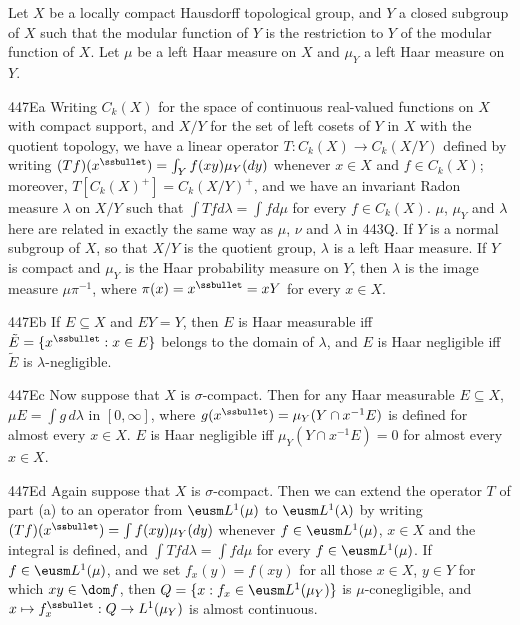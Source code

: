 Let $X$ be a locally compact Hausdorff topological group,
and $Y$ a closed subgroup of $X$ such that the modular function of $Y$
is the restriction to $Y$ of the modular function of $X$.   Let $\mu$ be
a left Haar measure on $X$ and $\mu_Y$ a left Haar measure on $Y$.

\spheader 447Ea Writing $C_k(X)$ for the space of continuous real-valued
functions on $X$ with compact support, and $X/Y$ for the set of left
cosets of $Y$ in $X$ with the quotient topology, we have a linear
operator $T:C_k(X)\to C_k(X/Y)$ defined by writing
$(Tf)(x^{\ssbullet})=\int_Yf(xy)\mu_Y(dy)$ whenever $x\in X$ and
$f\in C_k(X)$;  moreover,
$T[C_k(X)^+]=C_k(X/Y)^+$, and we have an invariant
Radon measure
$\lambda$ on $X/Y$ such that $\int Tfd\lambda=\int fd\mu$ for every
$f\in C_k(X)$.
 $\mu$,
$\mu_Y$ and $\lambda$ here are related
in exactly the same way as $\mu$, $\nu$ and $\lambda$ in 443Q.
If $Y$ is a normal subgroup of $X$, so that $X/Y$ is the quotient group,
$\lambda$ is a left Haar measure.   If $Y$ is compact and $\mu_Y$ is the
Haar probability measure on $Y$, then $\lambda$ is the image measure
$\mu\pi^{-1}$, where $\pi(x)=x^{\ssbullet}=xY$ for every
$x\in X$.

\spheader 447Eb If $E\subseteq X$ and $EY=Y$, then $E$ is Haar
measurable iff $\tilde E=\{x^{\ssbullet}:x\in E\}$ belongs to the domain
of $\lambda$, and $E$ is Haar negligible iff $\tilde E$ is
$\lambda$-negligible.

\spheader 447Ec Now suppose that $X$ is $\sigma$-compact.   Then for any
Haar measurable $E\subseteq X$, $\mu E=\int g\,d\lambda$ in
$[0,\infty]$, where $g(x^{\ssbullet})=\mu_Y(Y\cap x^{-1}E)$ is defined for
almost every $x\in X$.   $E$
is Haar negligible
iff $\mu_Y(Y\cap x^{-1}E)=0$ for almost every $x\in X$.

\spheader 447Ed Again suppose that $X$ is $\sigma$-compact.   Then we
can extend the operator $T$ of part (a) to an operator from
$\eusm L^1(\mu)$ to $\eusm L^1(\lambda)$ by writing
$(Tf)(x^{\ssbullet})=\int f(xy)\mu_Y(dy)$ whenever $f\in\eusm L^1(\mu)$,
$x\in X$ and the integral is defined, and $\int Tfd\lambda=\int fd\mu$ for every
$f\in\eusm L^1(\mu)$.   If $f\in\eusm L^1(\mu)$, and
we set $f_x(y)=f(xy)$
for all those $x\in X$, $y\in Y$ for which $xy\in\dom f$, then
$Q=\{x:f_x\in\eusm L^1(\mu_Y)\}$ is $\mu$-conegligible, and
$x\mapsto f_x^{\ssbullet}:Q\to L^1(\mu_Y)$ is almost
continuous.

